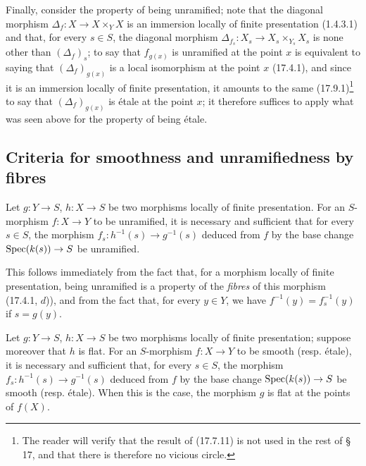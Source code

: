 Finally, consider the property of being unramified; note that the diagonal morphism $\Delta_f:X\to X\times_Y X$ is an immersion locally of finite presentation (1.4.3.1) and that, for every $s\in S$, the diagonal morphism $\Delta_{f_s}:X_s\to X_s\times_{Y_s}X_s$ is none other than $(\Delta_f)_s$; to say that $f_{g(x)}$ is unramified at the point $x$ is equivalent to saying that $(\Delta_f)_{g(x)}$ is a local isomorphism at the point $x$ (17.4.1), and since it is an immersion locally of finite presentation, it amounts to the same (17.9.1)\footnote{The reader will verify that the result of (17.7.11) is not used in the rest of § 17, and that there is therefore no vicious circle.} to say that $(\Delta_f)_{g(x)}$ is étale at the point $x$; it therefore suffices to apply what was seen above for the property of being étale.



\subsection{Criteria for smoothness and unramifiedness by fibres}
\label{IV.17.8}

\begin{proposition}[17.8.1]
\label{IV.17.8.1}
Let $g:Y\to S$, $h:X\to S$ be two morphisms locally of finite presentation. For an $S$-morphism $f:X\to Y$ to be unramified, it is necessary and sufficient that for every $s\in S$, the morphism $f_s:h^{-1}(s)\to g^{-1}(s)$ deduced from $f$ by the base change $\operatorname{Spec}(k(s))\to S$ be unramified.
\end{proposition}

This follows immediately from the fact that, for a morphism locally of finite presentation, being unramified is a property of the \emph{fibres} of this morphism (17.4.1, $d$)), and from the fact that, for every $y\in Y$, we have $f^{-1}(y)=f_s^{-1}(y)$ if $s=g(y)$.

\begin{proposition}[17.8.2]
\label{IV.17.8.2}
Let $g:Y\to S$, $h:X\to S$ be two morphisms locally of finite presentation; suppose moreover that $h$ is flat. For an $S$-morphism $f:X\to Y$ to be smooth (resp. étale), it is necessary and sufficient that, for every $s\in S$, the morphism $f_s:h^{-1}(s)\to g^{-1}(s)$ deduced from $f$ by the base change $\operatorname{Spec}(k(s))\to S$ be smooth (resp. étale). When this is the case, the morphism $g$ is flat at the points of $f(X)$.
\end{proposition}

